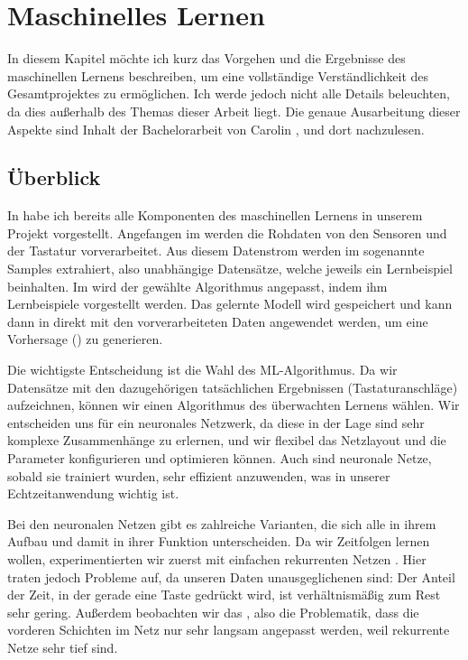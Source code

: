 \chapter{Maschinelles Lernen} 

In diesem Kapitel möchte ich kurz das Vorgehen und die Ergebnisse des
maschinellen Lernens beschreiben, um eine vollständige Verständlichkeit des
Gesamtprojektes zu ermöglichen. Ich werde jedoch nicht alle Details beleuchten,
da dies außerhalb des Themas dieser Arbeit liegt. Die genaue Ausarbeitung
dieser Aspekte sind Inhalt der Bachelorarbeit von Carolin \citet{caro}, und
dort nachzulesen.

\section{Überblick}

In  habe ich bereits alle Komponenten des maschinellen Lernens
in unserem Projekt vorgestellt. Angefangen im  werden
die Rohdaten von den Sensoren und der Tastatur vorverarbeitet. Aus diesem
Datenstrom werden im  sogenannte Samples extrahiert, also
unabhängige Datensätze, welche jeweils ein Lernbeispiel beinhalten. Im
 wird der gewählte Algorithmus angepasst, indem ihm
Lernbeispiele vorgestellt werden. Das gelernte Modell wird gespeichert und kann
dann in  direkt mit den vorverarbeiteten Daten
angewendet werden, um eine Vorhersage () zu generieren.

Die wichtigste Entscheidung ist die Wahl des ML-Algorithmus. Da wir Datensätze
mit den dazugehörigen tatsächlichen Ergebnissen (Tastaturanschläge)
aufzeichnen, können wir einen Algorithmus des überwachten Lernens wählen. Wir
entscheiden uns für ein neuronales Netzwerk, da diese in der Lage sind sehr
komplexe Zusammenhänge zu erlernen, und wir flexibel das Netzlayout und die
Parameter konfigurieren und optimieren können. Auch sind neuronale Netze,
sobald sie trainiert wurden, sehr effizient anzuwenden, was in unserer
Echtzeitanwendung wichtig ist.

Bei den neuronalen Netzen gibt es zahlreiche Varianten, die sich alle in ihrem
Aufbau und damit in ihrer Funktion unterscheiden. Da wir Zeitfolgen lernen
wollen, experimentierten wir zuerst mit einfachen rekurrenten Netzen
\citep{elman-rnn}. Hier traten jedoch Probleme auf, da unseren Daten
unausgeglichenen sind: Der Anteil der Zeit, in der gerade eine Taste gedrückt
wird, ist verhältnismäßig zum Rest sehr gering. Außerdem beobachten wir das
 \citep{hochreiter-vanishing-gradient},
also die Problematik, dass die vorderen Schichten im Netz nur sehr langsam
angepasst werden, weil rekurrente Netze sehr tief sind.

